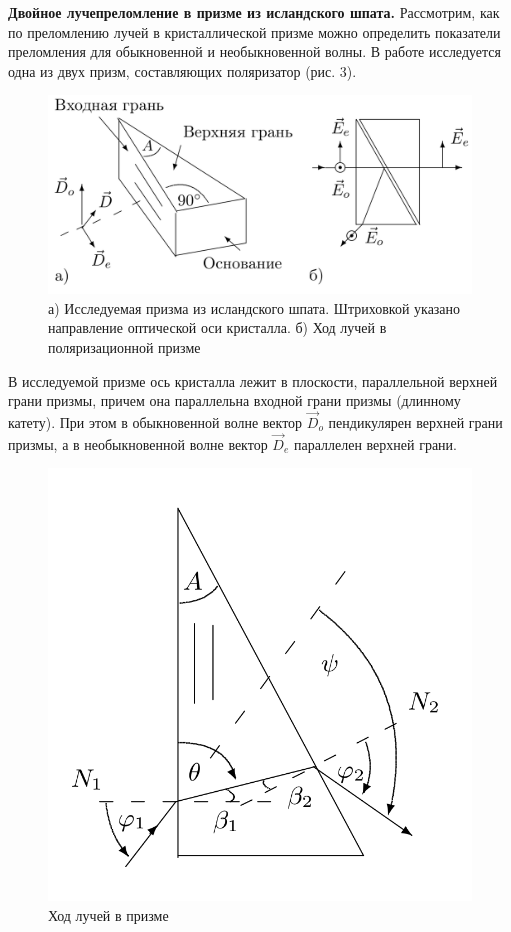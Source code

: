 \documentclass[10pt, a4paper]{article}
\begin{document}
\noindent \textbf{Двойное лучепреломление в призме из исландского шпата.} Рассмотрим, как по преломлению лучей в кристаллической призме можно определить показатели преломления для обыкновенной и необыкновенной волны. В работе исследуется одна из двух призм, составляющих поляризатор (рис. 3).
\begin{figure}[H]
	\includegraphics[width = 1.0\linewidth]{shpat.png}
	\caption{ а) Исследуемая призма из исландского шпата. Штриховкой указано направление оптической оси кристалла. б) Ход лучей в поляризационной призме}
\end{figure}	
В исследуемой призме ось кристалла лежит в плоскости, параллельной верхней грани призмы, причем она параллельна входной грани призмы (длинному катету). При этом в обыкновенной волне вектор $\vec D_o$ пендикулярен верхней грани призмы, а в необыкновенной волне вектор $\vec D_e$  параллелен верхней грани.
\begin{figure}
    \centering
    \includegraphics[width=1\textwidth]{prism.png}
    \caption{Ход лучей в призме}
\end{figure} 
\end{document}
